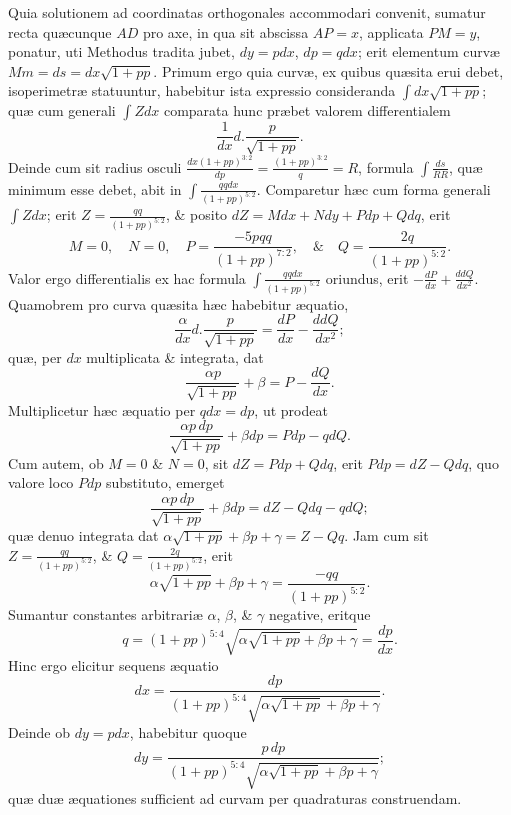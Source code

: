 Quia solutionem ad coordinatas orthogonales accommodari convenit, sumatur recta quæcunque $AD$ pro axe, in qua sit abscissa $AP=x$, applicata $PM=y$, ponatur, uti Methodus tradita jubet, $dy=pdx$, $dp=qdx$; erit elementum curvæ $Mm=ds=dx\sqrt{1+pp}$. Primum ergo quia curvæ, ex quibus quæsita erui debet, isoperimetræ statuuntur, habebitur ista expressio consideranda $\int dx\sqrt{1+pp}$; quæ cum generali $\int Zdx$ comparata hunc præbet valorem differentialem
\[\frac{1}{dx}d.\frac{p}{\sqrt{1+pp}}.\]
Deinde cum sit radius osculi $\frac{dx(1+pp)^{3:2}}{dp}=\frac{(1+pp)^{3:2}}q=R$, formula $\int\frac{ds}{RR}$, quæ minimum esse debet, abit in $\int\frac{qqdx}{(1+pp)^{5:2}}$. Comparetur hæc cum forma generali $\int Zdx$; erit $Z=\frac{qq}{(1+pp)^{5:2}}$, \& posito $dZ=Mdx+Ndy+Pdp+Qdq$, erit
\[M=0,\quad N=0,\quad P=\frac{-5pqq}{(1+pp)^{7:2}},\quad\&\quad Q=\frac{2q}{(1+pp)^{5:2}}.\]
Valor ergo differentialis ex hac formula $\int\frac{qqdx}{(1+pp)^{5:2}}$ oriundus, erit $-\frac{dP}{dx}+\frac{ddQ}{dx^2}$. Quamobrem pro curva quæsita hæc habebitur æquatio,
\[\frac{\alpha}{dx}d.\frac p{\sqrt{1+pp}}=\frac{dP}{dx}-\frac{ddQ}{dx^2};\]
quæ, per $dx$ multiplicata \& integrata, dat
\[\frac{\alpha p}{\sqrt{1+pp}}+\beta=P-\frac{dQ}{dx}.\]
Multiplicetur hæc æquatio per $qdx=dp$, ut prodeat
\[\frac{\alpha p\,dp}{\sqrt{1+pp}}+\beta dp=Pdp-qdQ.\]
Cum autem, ob $M=0$ \& $N=0$, sit $dZ=Pdp+Qdq$, erit $Pdp=dZ-Qdq$, quo valore loco $Pdp$ substituto, emerget
\[\frac{\alpha p\,dp}{\sqrt{1+pp}}+\beta dp=dZ-Qdq-qdQ;\]
quæ denuo integrata dat $\alpha\sqrt{1+pp}+\beta p+\gamma=Z-Qq$. Jam cum sit $Z=\frac{qq}{(1+pp)^{5:2}}$, \& $Q=\frac{2q}{(1+pp)^{5:2}}$, erit
\[\alpha\sqrt{1+pp}+\beta p+\gamma=\frac{-qq}{(1+pp)^{5:2}}.\]
Sumantur constantes arbitrariæ $\alpha$, $\beta$, \& $\gamma$ negative, eritque
\[q=(1+pp)^{5:4}\sqrt{\alpha\sqrt{1+pp}+\beta p+\gamma}=\frac{dp}{dx}.\]
Hinc ergo elicitur sequens æquatio
\[dx=\frac{dp}{(1+pp)^{5:4}\sqrt{\alpha\sqrt{1+pp}+\beta p+\gamma}}.\]
Deinde ob $dy=pdx$, habebitur quoque
\[dy=\frac{p\,dp}{(1+pp)^{5:4}\sqrt{\alpha\sqrt{1+pp}+\beta p+\gamma}};\]
quæ duæ æquationes sufficient ad curvam per quadraturas construendam.

